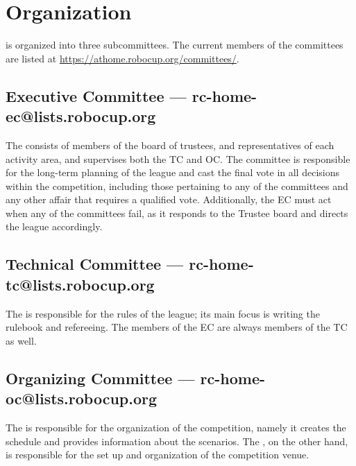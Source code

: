 \section{Organization}

\AtHome{} is organized into three subcommittees. The current members of the committees are listed at \url{https://athome.robocup.org/committees/}.

\subsection{Executive Committee --- rc-home-ec@lists.robocup.org}
\label{sec:ec}

The \EC{} consists of members of the board of trustees, and representatives of each activity area, and supervises both the TC and OC.
The committee is responsible for the long-term planning of the league and cast the final vote in all decisions within the competition, including those pertaining to any of the committees and any other affair that requires a qualified vote.
Additionally, the EC must act when any of the committees fail, as it responds to the Trustee board and directs the league accordingly.

\subsection{Technical Committee --- rc-home-tc@lists.robocup.org}
\label{sec:tc}

The \TC{} is responsible for the rules of the league; its main focus is writing the rulebook and refereeing.
The members of the EC are always members of the TC as well.

\subsection{Organizing Committee --- rc-home-oc@lists.robocup.org}
\label{sec:oc}

The \OC{} is responsible for the organization of the competition, namely it creates the schedule and provides information about the scenarios.
The \LOC{}, on the other hand, is responsible for the set up and organization of the competition venue.
